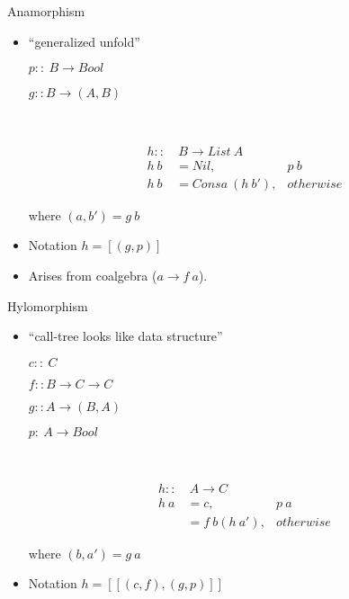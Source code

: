 \documentclass{beamer}
\begin{document}
\begin{frame}{Anamorphism}
\begin{itemize}
\item ``generalized unfold''

$p::\ B\rightarrow Bool$

$g:: B \rightarrow (A,B)$ 


~

\begin{align*}
h::&\  B \rightarrow List\ A\\ 
h\ b &= Nil, & p \ b \\
h\ b &=  Cons a\ (h\ b'),& otherwise
\end{align*}

where $(a,b') = g\ b $



\item Notation $h = [\!(g,p)\!]$
\item Arises from coalgebra ($a \rightarrow f\ a$).
\end{itemize}

\end{frame}

\begin{frame}{Hylomorphism}
\begin{itemize}
\item ``call-tree looks like data structure''

$c::\ C$

$f:: B\rightarrow C \rightarrow C$ 

$g:: A \rightarrow (B,A)$


$p:\ A\rightarrow Bool$

~

\begin{align*}
h::&\   A \rightarrow C\\
h\ a &= c, & p \ a \\
 &= f\ b (h\ a'), & otherwise
\end{align*}

where $(b, a') = g\ a$



\item Notation $h = [\![(c,f), (g,p)]\!]$
\end{itemize}

\end{frame}
\end{document}
